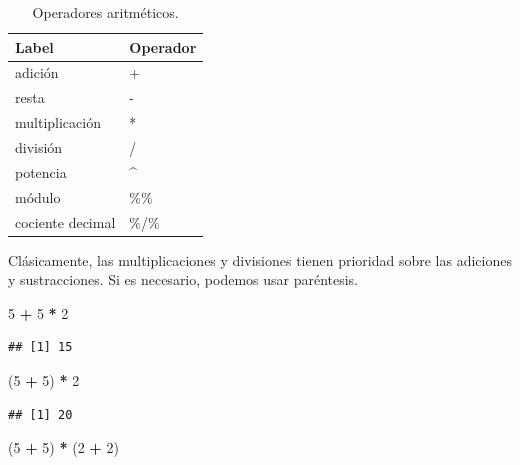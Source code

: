\documentclass[]{book}
\newenvironment{Shaded}{\begin{snugshade}}{\end{snugshade}}
\newcommand{\DecValTok}[1]{\textcolor[rgb]{0.00,0.00,0.81}{#1}}
\newcommand{\StringTok}[1]{\textcolor[rgb]{0.31,0.60,0.02}{#1}}
\newcommand{\OperatorTok}[1]{\textcolor[rgb]{0.81,0.36,0.00}{\textbf{#1}}}
\newcommand{\NormalTok}[1]{#1}
\begin{document}
\begin{table}

\caption{\label{tab:tabOpAri}Operadores aritméticos.\label{tab:tabOpAri}}
\centering
\begin{tabular}[t]{l|l}
\hline
Label & Operador\\
\hline
adición & +\\
\hline
resta & -\\
\hline
multiplicación & *\\
\hline
división & /\\
\hline
potencia & \textasciicircum{}\\
\hline
módulo & \%\%\\
\hline
cociente decimal & \%/\%\\
\hline
\end{tabular}
\end{table}

Clásicamente, las multiplicaciones y divisiones tienen prioridad sobre
las adiciones y sustracciones. Si es necesario, podemos usar paréntesis.

\begin{Shaded}
\begin{Highlighting}[]
\DecValTok{5} \OperatorTok{+}\StringTok{ }\DecValTok{5} \OperatorTok{*}\StringTok{ }\DecValTok{2}
\end{Highlighting}
\end{Shaded}

\begin{verbatim}
## [1] 15
\end{verbatim}

\begin{Shaded}
\begin{Highlighting}[]
\NormalTok{(}\DecValTok{5} \OperatorTok{+}\StringTok{ }\DecValTok{5}\NormalTok{) }\OperatorTok{*}\StringTok{ }\DecValTok{2}
\end{Highlighting}
\end{Shaded}

\begin{verbatim}
## [1] 20
\end{verbatim}

\begin{Shaded}
\begin{Highlighting}[]
\NormalTok{(}\DecValTok{5} \OperatorTok{+}\StringTok{ }\DecValTok{5}\NormalTok{) }\OperatorTok{*}\StringTok{ }\NormalTok{(}\DecValTok{2} \OperatorTok{+}\StringTok{ }\DecValTok{2}\NormalTok{)}
\end{Highlighting}
\end{Shaded}
\end{document}

